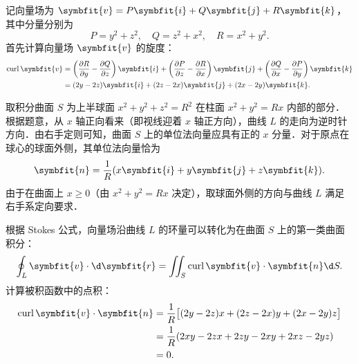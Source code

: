 \begin{solution}
    记向量场为 $\symbfit{v} = P\symbfit{i} + Q\symbfit{j} + R\symbfit{k}$，其中分量分别为
    \begin{equation}
        \label{eq:vector-components}
        P = y^2+z^2, \quad Q = z^2+x^2, \quad R = x^2+y^2.
    \end{equation}
    首先计算向量场 $\symbfit{v}$ 的旋度：
    \begin{equation}
        \label{eq:curl-v}
        \begin{aligned}
            \operatorname{curl} \symbfit{v} & = \left( \frac{\partial R}{\partial y} - \frac{\partial Q}{\partial z} \right)\symbfit{i} + \left( \frac{\partial P}{\partial z} - \frac{\partial R}{\partial x} \right)\symbfit{j} + \left( \frac{\partial Q}{\partial x} - \frac{\partial P}{\partial y} \right)\symbfit{k} \\
                                            & = (2y - 2z)\symbfit{i} + (2z - 2x)\symbfit{j} + (2x - 2y)\symbfit{k}.
        \end{aligned}
    \end{equation}

    取积分曲面 $S$ 为上半球面 $x^2+y^2+z^2=R^2$ 在柱面 $x^2+y^2=Rx$ 内部的部分．根据题意，从 $x$ 轴正向看来（即视线迎着 $x$ 轴正方向），曲线 $L$ 的走向为逆时针方向．由右手定则可知，曲面 $S$ 上的单位法向量应具有正的 $x$ 分量．对于原点在球心的球面外侧，其单位法向量恰为
    \begin{equation}
        \label{eq:normal-vector}
        \symbfit{n} = \frac{1}{R} (x\symbfit{i} + y\symbfit{j} + z\symbfit{k}).
    \end{equation}
    由于在曲面上 $x \geqslant 0$（由 $x^2+y^2=Rx$ 决定），取球面外侧的方向与曲线 $L$ 满足右手系定向要求．

    根据 Stokes 公式，向量场沿曲线 $L$ 的环量可以转化为在曲面 $S$ 上的第一类曲面积分：
    \begin{equation}
        \label{eq:stokes-formula}
        \oint_L \symbfit{v} \cdot \d\symbfit{r} = \iint_S \operatorname{curl} \symbfit{v} \cdot \symbfit{n} \d S.
    \end{equation}
    计算被积函数中的点积：
    \begin{equation}
        \label{eq:dot-product}
        \begin{aligned}
            \operatorname{curl} \symbfit{v} \cdot \symbfit{n} & = \frac{1}{R} \big[ (2y-2z)x + (2z-2x)y + (2x-2y)z \big] \\
                                                              & = \frac{1}{R} (2xy - 2zx + 2zy - 2xy + 2xz - 2yz)        \\
                                                              & = 0.
        \end{aligned}
    \end{equation}


\end{solution}
